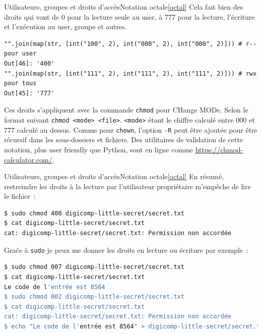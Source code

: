 \documentclass{beamer}
\begin{document}
    \begin{frame}[fragile]{Utilisateurs, groupes et droits d'accès}{Notation octale\cref{octal}}
        Cela fait bien des droits qui vont de 0 pour la lecture seule au user, à 777 pour la lecture, l'écriture et l'exécution au user, groupe et autres.
        \begin{lstlisting}
"".join(map(str, [int("100", 2), int("000", 2), int("000", 2)])) # r-- pour user
Out[46]: '400'
"".join(map(str, [int("111", 2), int("111", 2), int("111", 2)])) # rwx pour tous
Out[45]: '777'
        \end{lstlisting}
        Ces droits s'appliquent avec la commande \lstinline{chmod} pour CHange MODe.
        Selon le format suivant \lstinline{chmod <mode> <file>}.
        \lstinline{<mode>} étant le chiffre calculé entre 000 et 777 calculé au dessus.
        Comme pour \lstinline{chown}, l'option \lstinline{-R} peut être ajoutée pour être récursif dans les sous-dossiers et fichiers.
        \bigbreak
        Des utilitaires de validation de cette notation, plus user friendly que Python, sont en ligne comme \url{https://chmod-calculator.com/}.
    \end{frame}

    \begin{frame}[fragile]{Utilisateurs, groupes et droits d'accès}{Notation octale\cref{octal}}
        En résumé, restreindre les droits à la lecture par l'utilisateur propriétaire m'empêche de lire le fichier~:
        \begin{lstlisting}[language=bash]
$ sudo chmod 400 digicomp-little-secret/secret.txt
$ cat digicomp-little-secret/secret.txt
cat: digicomp-little-secret/secret.txt: Permission non accordée
        \end{lstlisting}
        Graĉe à \lstinline{sudo} je peux me donner les droits en lecture ou écriture par exemple~:
        \begin{lstlisting}[language=bash]
$ sudo chmod 007 digicomp-little-secret/secret.txt
$ cat digicomp-little-secret/secret.txt
Le code de l'entrée est 8564
$ sudo chmod 002 digicomp-little-secret/secret.txt
$ cat digicomp-little-secret/secret.txt
cat: digicomp-little-secret/secret.txt: Permission non accordée
$ echo "Le code de l'entrée est 8564" > digicomp-little-secret/secret.txt
        \end{lstlisting}
    \end{frame}
\end{document}
